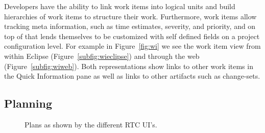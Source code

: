 Developers have the ability to link work items into logical units and build hierarchies of work items to structure their work.
Furthermore, work items allow tracking meta information, such as time estimates, severity, and priority, and on top of that lends themselves to be customized with self defined fields on a project configuration level.
For example in Figure~\ref{fig:wi} we see the work item view from within Eclipse (Figure~\ref{subfig:wieclipse}) and through the web (Figure~\ref{subfig:wiweb}).
Both representations show links to other work items in the Quick Information pane as well as links to other artifacts such as change-sets.

\subsection{Planning}
\begin{figure}[t]
\centering
{}
\caption{Plans as shown by the different RTC UI's.}
\label{fig:plan}
\end{figure}
